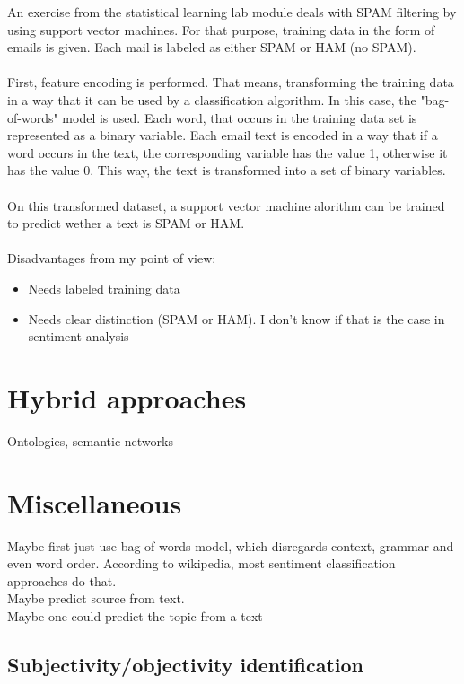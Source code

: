\documentclass{article}
\begin{document}
An exercise from the statistical learning lab module deals with SPAM filtering by using support vector machines. For that purpose, training data in the form of emails is given. Each mail is labeled as either SPAM or HAM (no SPAM).\\
\\
First, feature encoding is performed. That means, transforming the training data in a way that it can be used by a classification algorithm. In this case, the "bag-of-words" model is used. Each word, that occurs in the training data set is represented as a binary variable. Each email text is encoded in a way that if a word occurs in the text, the corresponding variable has the value 1, otherwise it has the value 0. This way, the text is transformed into a set of binary variables. 
\\
\\
On this transformed dataset, a support vector machine alorithm can be trained to predict wether a text is SPAM or HAM.
\\
\\
Disadvantages from my point of view:
\begin{itemize}
  \item Needs labeled training data
  \item Needs clear distinction (SPAM or HAM). I don't know if that is the case in  sentiment analysis
\end{itemize}

\section{Hybrid approaches}

Ontologies, semantic networks

\section{Miscellaneous}

Maybe first just use bag-of-words model, which disregards context, grammar and even word order. According to wikipedia, most sentiment classification approaches do that.
\\
Maybe predict source from text.
\\
Maybe one could predict the topic from a text

\subsection{Subjectivity/objectivity identification}



 
\end{document}
